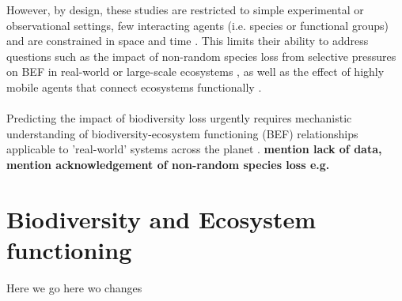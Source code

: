 %
However, by design, these studies are restricted to simple experimental or observational settings, few interacting agents (i.e. species or functional groups) and are constrained in space and time \citep{Dobson2006,Estes2011,Cardinale2012}. 
This limits their ability to address questions such as the impact of non-random species loss from selective pressures on BEF in real-world or large-scale ecosystems \citep{Saguin2014,Wardle2011}, as well as the effect of highly mobile agents that connect ecosystems functionally \citep{France2006}.  \\\\
%
Predicting the impact of biodiversity loss urgently requires mechanistic understanding of biodiversity-ecosystem functioning (BEF) relationships applicable to 'real-world' systems across the planet \citep{Dobson2006,Estes2011}. 
%
\textbf{mention lack of data, mention acknowledgement of non-random species loss e.g. \cite{Fox2012,Wardle2011,Saguin2014}}
\section{Biodiversity and Ecosystem functioning}
\label{chap:intro:biodiv}
Here we go  here wo changes
